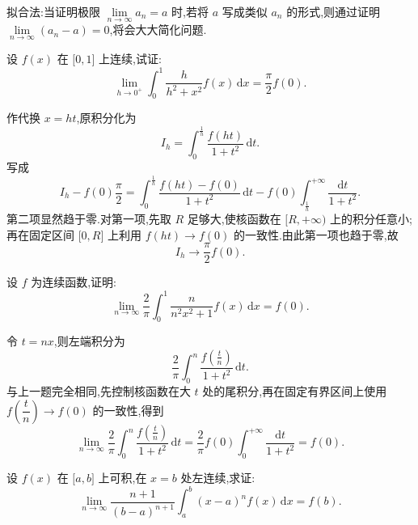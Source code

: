 拟合法:当证明极限 $\displaystyle\lim\limits_{n\to\infty}a_n=a$ 时,若将 $a$ 写成类似 $a_n$ 的形式,则通过证明 $\displaystyle\lim\limits_{n\to\infty}(a_n-a)=0$,将会大大简化问题.

\begin{example}
    设 $f(x)$ 在 $\lbrack 0,1\rbrack$ 上连续,试证:
    \[
        \displaystyle\lim\limits_{h\to0^+}\int_0^1\dfrac{h}{h^2+x^2}f(x)\,\mathrm{d}x
        =\dfrac{\pi}{2}f(0).
    \]
\end{example}
\exampleblank

\begin{solution}
    作代换 $x=ht$,原积分化为
    \[
        I_h=\int_0^{\frac{1}{h}}\dfrac{f(ht)}{1+t^2}\,\mathrm{d}t.
    \]
    写成
    \[
        I_h-f(0)\dfrac{\pi}{2}
        =\int_0^{\frac{1}{h}}\dfrac{f(ht)-f(0)}{1+t^2}\,\mathrm{d}t
        -f(0)\int_{\frac{1}{h}}^{+\infty}\dfrac{\mathrm{d}t}{1+t^2}.
    \]
    第二项显然趋于零.对第一项,先取 $R$ 足够大,使核函数在 $\lbrack R,+\infty)$ 上的积分任意小;再在固定区间 $\lbrack0,R\rbrack$ 上利用 $f(ht)\to f(0)$ 的一致性.由此第一项也趋于零,故
    \[
        I_h\longrightarrow\dfrac{\pi}{2}f(0).
    \]
\end{solution}

\begin{example}
    设 $f$ 为连续函数,证明:
    \[
        \displaystyle\lim\limits_{n\to\infty}\dfrac{2}{\pi}
        \int_0^1\dfrac{n}{n^2x^2+1}f(x)\,\mathrm{d}x=f(0).
    \]
\end{example}
\exampleblank

\begin{solution}
    令 $t=nx$,则左端积分为
    \[
        \dfrac{2}{\pi}\int_0^n
        \dfrac{f\left(\frac{t}{n}\right)}{1+t^2}\,\mathrm{d}t.
    \]
    与上一题完全相同,先控制核函数在大 $t$ 处的尾积分,再在固定有界区间上使用 $f\left(\dfrac{t}{n}\right)\to f(0)$ 的一致性,得到
    \[
        \displaystyle\lim\limits_{n\to\infty}\dfrac{2}{\pi}
        \int_0^n\dfrac{f\left(\frac{t}{n}\right)}{1+t^2}\,\mathrm{d}t
        =\dfrac{2}{\pi}f(0)\int_0^{+\infty}
        \dfrac{\mathrm{d}t}{1+t^2}
        =f(0).
    \]
\end{solution}

\begin{example}
    设 $f(x)$ 在 $\lbrack a,b\rbrack$ 上可积,在 $x=b$ 处左连续,求证:
    \[
        \displaystyle\lim\limits_{n\to\infty}
        \dfrac{n+1}{(b-a)^{n+1}}
        \int_a^b(x-a)^n f(x)\,\mathrm{d}x=f(b).
    \]
\end{example}
\exampleblank

